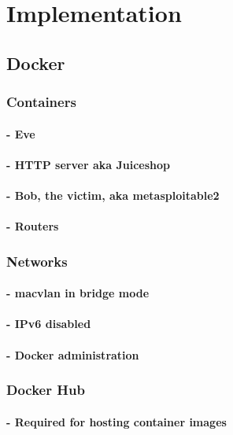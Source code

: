 \documentclass[a4paper,11pt,singlespacing]{article}
\begin{document}
\section{Implementation}
    \subsection{Docker}
        \subsubsection{Containers}
            \paragraph{- Eve}
            \paragraph{- HTTP server aka Juiceshop}
            \paragraph{- Bob, the victim, aka metasploitable2}
            \paragraph{- Routers}
        \subsubsection{Networks}
            \paragraph{- macvlan in bridge mode}
            \paragraph{- IPv6 disabled}
            \paragraph{- Docker administration}
        \subsubsection{Docker Hub}
            \paragraph{- Required for hosting container images}
\end{document}
